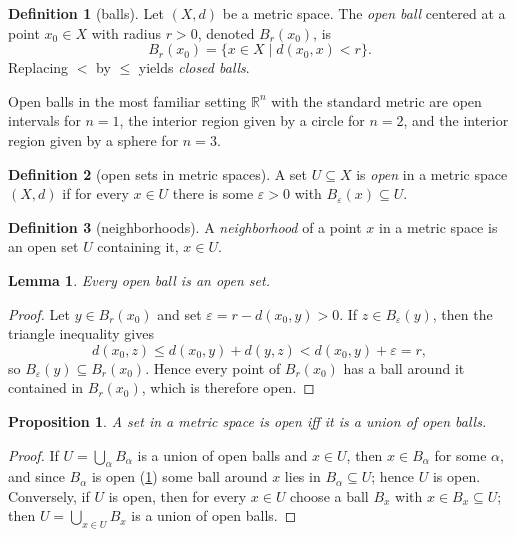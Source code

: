 \documentclass[11pt]{article}
\newtheorem{lemma}{Lemma}[section]
\newtheorem{prop}{Proposition}[section]
\theoremstyle{definition}
\newtheorem{definition}{Definition}[section]
\theoremstyle{remark}
\begin{document}
\begin{definition}[balls]
    Let $(X, d)$ be a metric space. The \emph{open ball} centered at a point $x_0 \in X$ with radius $r > 0$, denoted $B_r(x_0)$, is
    \[
    B_r(x_0) = \{x \in X \mid d(x_0, x) < r\}.
    \]
    Replacing $<$ by $\leq$ yields \emph{closed balls}.
\end{definition}

Open balls in the most familiar setting $\mathbb{R}^n$ with the standard metric are open intervals for $n = 1$, the interior region given by a circle for $n = 2$, and the interior region given by a sphere for $n = 3$.

\begin{definition}[open sets in metric spaces]
    \label{metricopen}
    A set $U \subseteq X$ is \emph{open} in a metric space $(X, d)$ if for every $x \in U$ there is some $\varepsilon > 0$ with $B_\varepsilon(x) \subseteq U$.
\end{definition}

\begin{definition}[neighborhoods]
    A \emph{neighborhood} of a point $x$ in a metric space is an open set $U$ containing it, $x \in U$.
\end{definition}

\begin{lemma}
    \label{ballsopen}
    Every open ball is an open set.
\end{lemma}

\begin{proof}
    Let $y \in B_r(x_0)$ and set $\varepsilon = r - d(x_0, y) > 0$. If $z \in B_\varepsilon(y)$, then the triangle inequality gives
    \[
    d(x_0, z) \leq d(x_0, y) + d(y, z) < d(x_0, y) + \varepsilon = r,
    \]
    so $B_\varepsilon(y) \subseteq B_r(x_0)$. Hence every point of $B_r(x_0)$ has a ball around it contained in $B_r(x_0)$, which is therefore open.
\end{proof}

\begin{prop}
    \label{unionballs}
    A set in a metric space is open iff it is a union of open balls.
\end{prop}

\begin{proof}
    If $U = \bigcup_\alpha B_\alpha$ is a union of open balls and $x \in U$, then $x \in B_\alpha$ for some $\alpha$, and since $B_\alpha$ is open (\cref{ballsopen}) some ball around $x$ lies in $B_\alpha \subseteq U$; hence $U$ is open. Conversely, if $U$ is open, then for every $x \in U$ choose a ball $B_x$ with $x \in B_x \subseteq U$; then $U = \bigcup_{x \in U} B_x$ is a union of open balls.
\end{proof}
\end{document}
